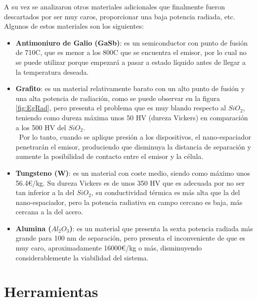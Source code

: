 A su vez se analizaron otros materiales adicionales que finalmente fueron descartados por ser muy caros, proporcionar una baja potencia radiada, etc. %
Algunos de estos materiales son los siguientes:

\begin{itemize}
	\item \textbf{Antimoniuro de Galio (GaSb)}: es un semiconductor con punto de fusión de 710\textdegree C, que es menor a los 800\textdegree C que se encuentra el emisor, por lo cual no se puede utilizar porque empezará a pasar a estado líquido antes de llegar a la temperatura deseada.
	\item \textbf{Grafito}: es un material relativamente barato con un alto punto de fusión y una alta potencia de radiación, como se puede observar en la figura \ref{fig:EgRad}, pero presenta el problema que es muy blando respecto al $SiO_2$, teniendo como dureza máxima unos 50 HV (dureza Vickers) en comparación a los 500 HV del $SiO_2$.\\\ Por lo tanto, cuando se aplique presión a los dispositivos, el nano-espaciador penetrarán el emisor, produciendo que disminuya la distancia de separación y aumente la posibilidad de contacto entre el emisor y la célula.
	\item \textbf{Tungsteno (W)}: es un material con coste medio, siendo como máximo unos 56.4€/kg. Su dureza Vickers es de unos 350 HV que es adecuada por no ser tan inferior a la del $SiO_2$, su conductividad térmica es más alta que la del nano-espaciador, pero la potencia radiativa en campo cercano es baja, más cercana a la del acero.
	\item \textbf{Alumina ($Al_2O_3$)}: es un material que presenta la sexta potencia radiada más grande para 100 nm de separación, pero presenta el inconveniente de que es muy caro, aproximadamente 16000€/kg o más, disminuyendo considerablemente la viabilidad del sistema.
\end{itemize}

\section{Herramientas}


